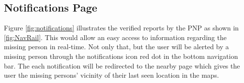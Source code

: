 \subsection{Notifications Page}

Figure \ref{fig:notifications} illustrates the verified reports by the PNP as shown in \ref{fig:NavRail}. This would allow an easy access to information regarding the missing person in real-time. Not only that, but the user will be alerted by a missing person through the notifications icon red dot in the bottom navigation bar. The each notification will be redirected to the nearby page which gives the user the missing persons' vicinity of their last seen location in the maps.  

\begin{figure}[!h]
    \centering
    \begin{subfigure}[c]{0.30\linewidth}
        \centering

\end{subfigure}
\end{figure}
